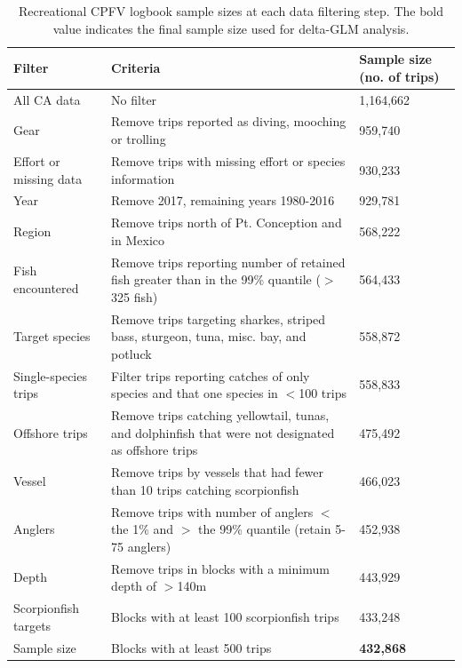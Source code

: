 \documentclass[12pt,]{article}
\begin{document}
\begin{table}[ht]
\centering
\caption{Recreational CPFV logbook sample 
                                          sizes at each data filtering step.  
                                          The bold value indicates the final sample size 
                                          used for delta-GLM analysis.} 
\label{tab:Fleet5_RecPC_CPFVlogbook_filter}
\begin{tabular}{>{\raggedright}p{1.5in}>{\raggedright}p{3in}>{\raggedright}p{1in}}
  \hline
Filter & Criteria & Sample size (no. of trips) \\ 
  \hline
All CA data & No filter & 1,164,662 \\ 
  Gear & Remove trips reported as diving, mooching or trolling & 959,740 \\ 
  Effort or missing data & Remove trips with missing effort or species information & 930,233 \\ 
  Year & Remove 2017, remaining years 1980-2016 & 929,781 \\ 
  Region & Remove trips north of Pt. Conception and in Mexico & 568,222 \\ 
  Fish encountered & Remove trips reporting number of retained fish greater than in the 99\% quantile ($>$325 fish) & 564,433 \\ 
  Target species & Remove trips targeting sharkes, striped bass, sturgeon, tuna, misc. bay, and potluck & 558,872 \\ 
  Single-species trips & Filter trips reporting catches of only species and that one species in $<$100 trips & 558,833 \\ 
  Offshore trips & Remove trips catching yellowtail, tunas, and dolphinfish that were not designated as offshore trips & 475,492 \\ 
  Vessel & Remove trips by vessels that had fewer than 10 trips catching scorpionfish & 466,023 \\ 
  Anglers & Remove trips with number of anglers $<$ the 1\% and $>$ the 99\% quantile (retain 5-75 anglers) & 452,938 \\ 
  Depth & Remove trips in blocks with a minimum depth of $>$140m & 443,929 \\ 
  Scorpionfish targets & Blocks with at least 100 scorpionfish trips & 433,248 \\ 
  Sample size & Blocks with at least 500 trips & \textbf{432,868} \\ 
   \hline
\end{tabular}
\end{table}\newpage
\end{document}
